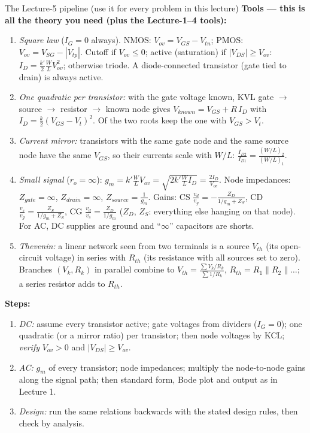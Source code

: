 \documentclass[11pt]{article}
\begin{document}
\begin{cardbox}{The Lecture-5 pipeline (use it for every problem in this lecture)}
\textbf{Tools --- this is all the theory you need (plus the Lecture-1--4 tools):}
\begin{enumerate}[label=\textbf{T\arabic*},leftmargin=2.2em,itemsep=1pt]
\item \emph{Square law} ($I_G = 0$ always). NMOS: $V_{ov} = V_{GS} - V_{tn}$; PMOS: $V_{ov} = V_{SG} - |V_{tp}|$.
      Cutoff if $V_{ov}\le 0$; active (saturation) if $|V_{DS}| \ge V_{ov}$:
      $I_D = \frac{k'}{2}\frac{W}{L}V_{ov}^2$; otherwise triode.
      A diode-connected transistor (gate tied to drain) is always active.
\item \emph{One quadratic per transistor:} with the gate voltage known, KVL gate $\to$ source $\to$ resistor $\to$
      known node gives $V_{known} = V_{GS} + R\,I_D$ with $I_D = \frac{k}{2}(V_{GS}-V_t)^2$. Of the two roots keep
      the one with $V_{GS} > V_t$.
\item \emph{Current mirror:} transistors with the same gate node and the same source node have the same $V_{GS}$,
      so their currents scale with $W/L$: $\frac{I_{D2}}{I_{D1}} = \frac{(W/L)_2}{(W/L)_1}$.
\item \emph{Small signal} ($r_o = \infty$): $g_m = k'\frac{W}{L}V_{ov} = \sqrt{2k'\frac{W}{L}I_D} = \frac{2I_D}{V_{ov}}$.
      Node impedances: $Z_{gate} = \infty$, $Z_{drain} = \infty$, $Z_{source} = \frac{1}{g_m}$. Gains: CS
      $\frac{v_d}{v_g} = -\frac{Z_D}{1/g_m + Z_S}$, CD $\frac{v_s}{v_g} = \frac{Z_S}{1/g_m + Z_S}$, CG
      $\frac{v_d}{v_s} = \frac{Z_D}{1/g_m}$ ($Z_D$, $Z_S$: everything else hanging on that node). For AC, DC supplies
      are ground and ``$\infty$'' capacitors are shorts.
\item \emph{Thevenin:} a linear network seen from two terminals is a source $V_{th}$ (its open-circuit voltage) in
      series with $R_{th}$ (its resistance with all sources set to zero). Branches $(V_k, R_k)$ in parallel combine to
      $V_{th} = \frac{\sum V_k/R_k}{\sum 1/R_k}$, $R_{th} = R_1\|R_2\|\dots$; a series resistor adds to $R_{th}$.
\end{enumerate}
\textbf{Steps:}
\begin{enumerate}[leftmargin=2.2em,itemsep=1pt]
\item \emph{DC:} assume every transistor active; gate voltages from dividers ($I_G=0$); one quadratic (or a mirror
      ratio) per transistor; then node voltages by KCL; \emph{verify} $V_{ov} > 0$ and $|V_{DS}| \ge V_{ov}$.
\item \emph{AC:} $g_m$ of every transistor; node impedances; multiply the node-to-node gains along the signal path;
      then standard form, Bode plot and output as in Lecture 1.
\item \emph{Design:} run the same relations backwards with the stated design rules, then check by analysis.
\end{enumerate}
\end{cardbox}
\end{document}
